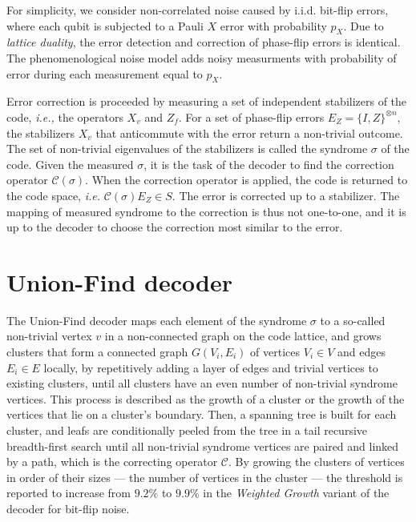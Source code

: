 For simplicity, we consider non-correlated noise caused by i.i.d. bit-flip errors, where each qubit is subjected to a Pauli $X$ error with probability $p_X$. Due to \emph{lattice duality}, the error detection and correction of phase-flip errors is identical. The phenomenological noise model adds noisy measurments with probability of error during each measurement equal to $p_X$. 

Error correction is proceeded by measuring a set of independent stabilizers of the code, \emph{i.e.,} the operators $X_v$ and $Z_f$. For a set of phase-flip errors $E_Z = \{I,Z\}^{\otimes n}$, the stabilizers $X_v$ that anticommute with the error return a non-trivial outcome. The set of non-trivial eigenvalues of the stabilizers is called the syndrome $\sigma$ of the code. Given the measured $\sigma$, it is the task of the decoder to find the correction operator $\mathcal{C}(\sigma)$. When the correction operator is applied, the code is returned to the code space, \emph{i.e.} $\mathcal{C}(\sigma)E_Z \in S$. The error is corrected up to a stabilizer. The mapping of measured syndrome to the correction is thus not one-to-one, and it is up to the decoder to choose the correction most similar to the error. 

\section{Union-Find decoder}\label{sec:unionfind}

The Union-Find decoder \cites{delfosse2017linear, delfosse2017almost} maps each element of the syndrome $\sigma$ to a so-called non-trivial vertex $v$ in a non-connected graph on the code lattice, and grows clusters that form a connected graph $G(V_i, E_i)$ of vertices $V_i\in V$ and edges $E_i \in E$ locally, by repetitively adding a layer of edges and trivial vertices to existing clusters, until all clusters have an even number of non-trivial syndrome vertices. This process is described as the growth of a cluster or the growth of the vertices that lie on a cluster's boundary. Then, a spanning tree is built for each cluster, and leafs are conditionally peeled from the tree in a tail recursive breadth-first search until all non-trivial syndrome vertices are paired and linked by a path, which is the correcting operator $\mathcal{C}$. By growing the clusters of vertices in order of their sizes --- the number of vertices in the cluster --- the threshold is reported to increase from $9.2\%$ to $9.9\%$ in the \emph{Weighted Growth} variant of the decoder for bit-flip noise.

